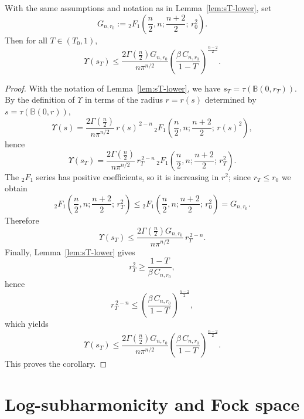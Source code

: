 \documentclass[a4paper,10pt]{amsart}
\begin{document}
\begin{numcor}\label{cor:Upsilon-sT}
With the same assumptions and notation as in Lemma~\ref{lem:sT-lower}, set
\[
G_{n,r_0}:={}_2F_1\!\left(\frac n2,n;\frac{n+2}{2};\,r_0^2\right).
\]
Then for all $T\in(T_0,1)$,
\[
\Upsilon(s_T)\le
\frac{2\Gamma\!\left(\frac n2\right) G_{n,r_0}}{n\pi^{n/2}}
\left(\frac{\beta\,C_{n,r_0}}{1-T}\right)^{\!\frac{n-2}{2}}.
\]
\end{numcor}

\begin{proof}
With the notation of Lemma~\ref{lem:sT-lower}, we have $s_T=\tau(\mathbb B(0,r_T))$.
By the definition of $\Upsilon$ in terms of the radius $r=r(s)$ determined by
$s=\tau(\mathbb B(0,r))$,
\[
\Upsilon(s)=\frac{2\Gamma\!\left(\frac n2\right)}{n\pi^{n/2}}\,
r(s)^{\,2-n}\,
{}_2F_1\!\left(\frac n2,n;\frac{n+2}{2};\,r(s)^2\right),
\]
hence
\[
\Upsilon(s_T)=\frac{2\Gamma\!\left(\frac n2\right)}{n\pi^{n/2}}\,
r_T^{\,2-n}\,
{}_2F_1\!\left(\frac n2,n;\frac{n+2}{2};\,r_T^2\right).
\]
The ${}_2F_1$ series has positive coefficients, so it is increasing in $r^2$; since
$r_T\le r_0$ we obtain
\[
{}_2F_1\!\left(\frac n2,n;\frac{n+2}{2};\,r_T^2\right)
\le {}_2F_1\!\left(\frac n2,n;\frac{n+2}{2};\,r_0^2\right)
=G_{n,r_0}.
\]
Therefore
\[
\Upsilon(s_T)\le
\frac{2\Gamma\!\left(\frac n2\right) G_{n,r_0}}{n\pi^{n/2}}\,
r_T^{\,2-n}.
\]
Finally, Lemma~\ref{lem:sT-lower} gives
\[
r_T^2\ge \frac{1-T}{\beta\,C_{n,r_0}},
\]
hence
\[
r_T^{\,2-n}\le \left(\frac{\beta\,C_{n,r_0}}{1-T}\right)^{\frac{n-2}{2}},
\]
which yields
\[
\Upsilon(s_T)\le
\frac{2\Gamma\!\left(\frac n2\right) G_{n,r_0}}{n\pi^{n/2}}
\left(\frac{\beta\,C_{n,r_0}}{1-T}\right)^{\!\frac{n-2}{2}}.
\]
This proves the corollary.
\end{proof}












\section{Log-subharmonicity and Fock space}
\end{document}
